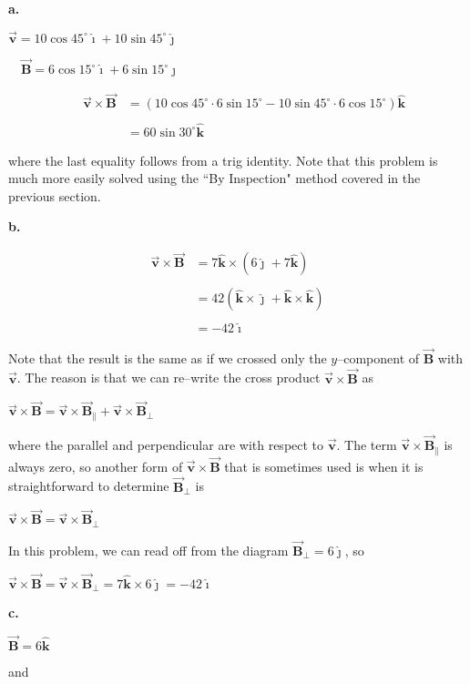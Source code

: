 \documentclass{article}
\newcommand{\ihat}[0]{\hat{\boldsymbol{\imath}}}
\newcommand{\jhat}[0]{\hat{\boldsymbol{\jmath}}}
\newcommand{\khat}[0]{\hat{\boldsymbol{k}}}
\newcommand{\bfvec}[1]{\vec{\mathbf{#1}}}
\begin{document}


\ifsolutions
\textbf{a.}

$\bfvec{v}=10\cos 45^\circ\ihat + 10\sin 45^\circ\jhat$

$\quad\bfvec{B}=6\cos 15^\circ\ihat + 6\sin 15^\circ\jhat$

$$
\begin{align*}
\quad\bfvec{v}\times\bfvec{B} &= (10\cos 45^\circ \cdot 6\sin 15^\circ-10\sin 45^\circ \cdot 6\cos 15^\circ)\khat\\\\
&= 60\sin 30^\circ\khat
\end{align*}
$$

where the last equality follows from a trig identity. Note that this problem is much more easily solved using the ``By Inspection" method covered in the previous section.

\textbf{b.}

$$
\begin{align*}
\bfvec{v}\times\bfvec{B} &= 7\khat \times (6\jhat + 7\khat) \\\\
&= 42(\khat\times\jhat + \khat\times\khat) \\\\
&= -42\ihat
\end{align*}
$$

Note that the result is the same as if we crossed only the $y$--component of $\bfvec{B}$ with $\bfvec{v}$. The reason is that we can re--write the cross product $\bfvec{v}\times\bfvec{B}$ as

$\bfvec{v}\times\bfvec{B} = \bfvec{v}\times\bfvec{B}_\parallel+\bfvec{v}\times\bfvec{B}_\perp$

where the parallel and perpendicular are with respect to $\bfvec{v}$. The term $\bfvec{v}\times\bfvec{B}_\parallel$ is always zero, so another form of $\bfvec{v}\times\bfvec{B}$ that is sometimes used is when it is straightforward to determine $\bfvec{B}_\perp$ is

$\bfvec{v}\times\bfvec{B} = \bfvec{v}\times\bfvec{B}_\perp$

In this problem, we can read off from the diagram $\bfvec{B}_\perp=6\jhat$, so 

$\bfvec{v}\times\bfvec{B} = \bfvec{v}\times\bfvec{B}_\perp = 7\khat\times 6\jhat = -42\ihat$

\textbf{c.}

$\bfvec{B}=6\khat$

and
\end{document}
